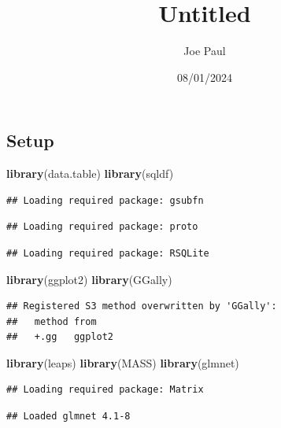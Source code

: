 \documentclass[
]{article}
\title{Untitled}
\author{Joe Paul}
\date{08/01/2024}
\newenvironment{Shaded}{\begin{snugshade}}{\end{snugshade}}
\newcommand{\FunctionTok}[1]{\textcolor[rgb]{0.13,0.29,0.53}{\textbf{#1}}}
\newcommand{\NormalTok}[1]{#1}
\begin{document}
\maketitle

\subsection{Setup}\label{setup}

\begin{Shaded}
\begin{Highlighting}[]
\FunctionTok{library}\NormalTok{(data.table)}
\FunctionTok{library}\NormalTok{(sqldf)}
\end{Highlighting}
\end{Shaded}

\begin{verbatim}
## Loading required package: gsubfn
\end{verbatim}

\begin{verbatim}
## Loading required package: proto
\end{verbatim}

\begin{verbatim}
## Loading required package: RSQLite
\end{verbatim}

\begin{Shaded}
\begin{Highlighting}[]
\FunctionTok{library}\NormalTok{(ggplot2)}
\FunctionTok{library}\NormalTok{(GGally)}
\end{Highlighting}
\end{Shaded}

\begin{verbatim}
## Registered S3 method overwritten by 'GGally':
##   method from   
##   +.gg   ggplot2
\end{verbatim}

\begin{Shaded}
\begin{Highlighting}[]
\FunctionTok{library}\NormalTok{(leaps)}
\FunctionTok{library}\NormalTok{(MASS)}
\FunctionTok{library}\NormalTok{(glmnet)}
\end{Highlighting}
\end{Shaded}

\begin{verbatim}
## Loading required package: Matrix
\end{verbatim}

\begin{verbatim}
## Loaded glmnet 4.1-8
\end{verbatim}
\end{document}
